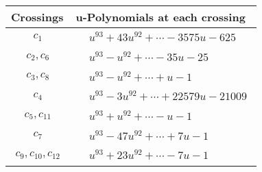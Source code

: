 \documentclass[1p]{elsarticle_modified}
\theoremstyle{definition}
\begin{document}
\begin{tabular}{m{50pt}|m{274pt}}
Crossings & \hspace{64pt}u-Polynomials at each crossing \\
\hline $$\begin{aligned}c_{1}\end{aligned}$$&$\begin{aligned}
&u^{93}+43 u^{92}+\cdots-3575 u-625
\end{aligned}$\\
\hline $$\begin{aligned}c_{2},c_{6}\end{aligned}$$&$\begin{aligned}
&u^{93}- u^{92}+\cdots-35 u-25
\end{aligned}$\\
\hline $$\begin{aligned}c_{3},c_{8}\end{aligned}$$&$\begin{aligned}
&u^{93}- u^{92}+\cdots+u-1
\end{aligned}$\\
\hline $$\begin{aligned}c_{4}\end{aligned}$$&$\begin{aligned}
&u^{93}-3 u^{92}+\cdots+22579 u-21009
\end{aligned}$\\
\hline $$\begin{aligned}c_{5},c_{11}\end{aligned}$$&$\begin{aligned}
&u^{93}+u^{92}+\cdots- u-1
\end{aligned}$\\
\hline $$\begin{aligned}c_{7}\end{aligned}$$&$\begin{aligned}
&u^{93}-47 u^{92}+\cdots+7 u-1
\end{aligned}$\\
\hline $$\begin{aligned}c_{9},c_{10},c_{12}\end{aligned}$$&$\begin{aligned}
&u^{93}+23 u^{92}+\cdots-7 u-1
\end{aligned}$\\
\hline
\end{tabular}\\~\\
\newpage\renewcommand{\arraystretch}{1}
\end{document}
